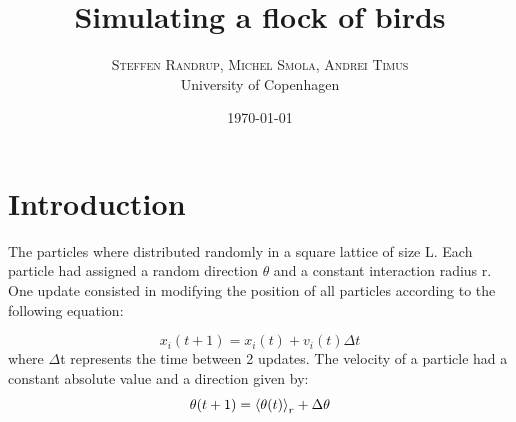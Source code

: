 \documentclass[twoside,twocolumn]{article}
\title{Simulating a flock of birds} %
\author{%
\textsc{Steffen Randrup, Michel Smola, Andrei Timus}\\[1ex] %
\normalsize University of Copenhagen \\ %
}
\date{\today} %
\begin{document}
\maketitle


\section{Introduction}


The particles where distributed randomly in a square lattice of size L. Each particle had assigned a random direction $\theta$ and a constant interaction radius r. One update consisted in modifying the position of all particles according to the following equation:

\begin{equation}
x_{i}(t+1)=x_i(t)+v_i(t)\Delta t
\end{equation}
where $\Delta$t represents the time between 2 updates.
The velocity of a particle had a constant absolute value and a direction given by:
\begin{equation}
\theta(t+1)=\braket{\theta(t)}_r+\Delta \theta
\end{equation} 
\end{document}
